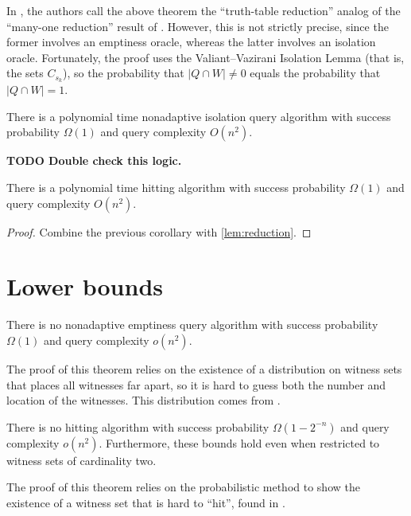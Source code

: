 \documentclass{article}
\newcommand{\todo}[1]{\textbf{TODO #1}}
\begin{document}
In \autocite{krw12}, the authors call the above theorem the ``truth-table reduction'' analog of the ``many-one reduction'' result of \autocite[Theorem~4.2]{dkvmw13}.
However, this is not strictly precise, since the former involves an emptiness oracle, whereas the latter involves an isolation oracle.
Fortunately, the proof uses the Valiant--Vazirani Isolation Lemma (that is, the sets $C_{s_k}$), so the probability that $|Q \cap W| \neq 0$ equals the probability that $|Q \cap W| = 1$.

\begin{corollary}
  There is a polynomial time nonadaptive isolation query algorithm with success probability $\Omega(1)$ and query complexity $O(n^2)$.
\end{corollary}

\todo{Double check this logic.}

\begin{corollary}
  There is a polynomial time hitting algorithm with success probability $\Omega(1)$ and query complexity $O(n^2)$.
\end{corollary}
\begin{proof}
  Combine the previous corollary with \autoref{lem:reduction}.
\end{proof}

\section{Lower bounds}

\begin{theorem}\label{thm:nonadaptiveemptiness}
  There is no nonadaptive emptiness query algorithm with success probability $\Omega(1)$ and query complexity $o(n^2)$.
\end{theorem}

The proof of this theorem relies on the existence of a distribution on witness sets that places all witnesses far apart, so it is hard to guess both the number and location of the witnesses.
This distribution comes from \autocite[Theorem~4.2]{dkvmw13}.

\begin{theorem}
  There is no hitting algorithm with success probability $\Omega(1 - 2^{-n})$ and query complexity $o(n^2)$.
  Furthermore, these bounds hold even when restricted to witness sets of cardinality two.
\end{theorem}

The proof of this theorem relies on the probabilistic method to show the existence of a witness set that is hard to ``hit'', found in \autocite{ablp91}.
\end{document}
